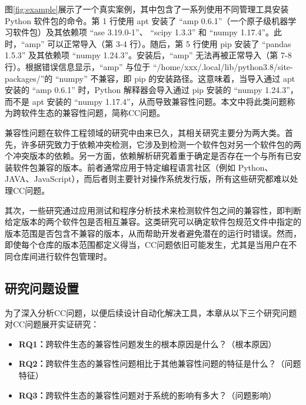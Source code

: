 图\ref{fig:example}展示了一个真实案例，其中包含了一系列使用不同管理工具安装 Python 软件包的命令。第 1 行使用 apt 安装了 “amp 0.6.1”（一个原子级机器学习软件包）及其依赖项 “ase 3.19.0-1”、 “scipy 1.3.3” 和 “numpy 1.17.4”。此时，“amp” 可以正常导入（第 3-4 行）。随后，第 5 行使用 pip 安装了 “pandas 1.5.3” 及其依赖项 “numpy 1.24.3”。安装后，“amp” 无法再被正常导入（第 7-8 行）。根据错误信息显示，“amp” 与位于 “/home/xxx/.local/lib/python3.8/site-packages/”的 “numpy” 不兼容，即 pip 的安装路径。这意味着，当导入通过 apt 安装的 “amp 0.6.1” 时，Python 解释器会导入通过 pip 安装的 “numpy 1.24.3”，而不是 apt 安装的 “numpy 1.17.4”，从而导致兼容性问题。本文中将此类问题称为跨软件生态的兼容性问题，简称CC问题。

兼容性问题在软件工程领域的研究中由来已久，其相关研究主要分为两大类。首先，许多研究致力于依赖冲突检测，它涉及到检测一个软件包对另一个软件包的两个冲突版本的依赖。另一方面，依赖解析研究着重于确定是否存在一个与所有已安装软件包兼容的版本。前者通常应用于特定编程语言社区（例如 Python、JAVA、JavaScript），而后者则主要针对操作系统发行版，所有这些研究都难以处理CC问题。

其次，一些研究通过应用测试和程序分析技术来检测软件包之间的兼容性，即判断给定版本的两个软件包是否相互兼容。这类研究可以确定软件包规范文件中指定的版本范围是否包含不兼容的版本，从而帮助开发者避免潜在的运行时错误。然而，即使每个仓库的版本范围都定义得当，CC问题依旧可能发生，尤其是当用户在不同仓库间进行软件包管理时。

\subsection{研究问题设置}
为了深入分析CC问题，以便后续设计自动化解决工具，本章从以下三个研究问题对CC问题展开实证研究：
\begin{itemize}
	\item \textbf{RQ1：}跨软件生态的兼容性问题发生的根本原因是什么？（根本原因）
	\item \textbf{RQ2：}跨软件生态的兼容性问题相比于其他兼容性问题的特征是什么？（问题特征）
	\item \textbf{RQ3：}跨软件生态的兼容性问题对于系统的影响有多大？（问题影响）
\end{itemize}

